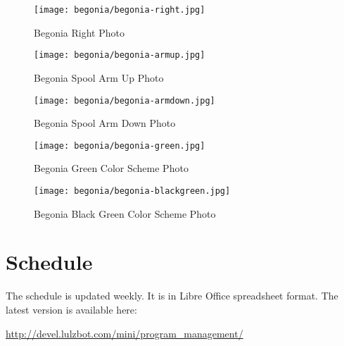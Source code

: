\begin{figure}[H]
\centering
\texttt{[image: begonia/begonia-right.jpg]}
\caption{Begonia Right Photo}
\label{fig:begrightfoto}
\end{figure}

\begin{figure}[H]
\centering
\texttt{[image: begonia/begonia-armup.jpg]}
\caption{Begonia Spool Arm Up Photo}
\label{fig:begarmup}
\end{figure}

\begin{figure}[H]
\centering
\texttt{[image: begonia/begonia-armdown.jpg]}
\caption{Begonia Spool Arm Down Photo}
\label{fig:begarmdown}
\end{figure}

\begin{figure}[H]
\centering
\texttt{[image: begonia/begonia-green.jpg]}
\caption{Begonia Green Color Scheme Photo}
\label{fig:beggreen}
\end{figure}

\begin{figure}[H]
\centering
\texttt{[image: begonia/begonia-blackgreen.jpg]}
\caption{Begonia Black Green Color Scheme Photo}
\label{fig:begblackgreen}
\end{figure}


\section{Schedule}
The schedule is updated weekly. It is in Libre Office spreadsheet format. The
latest version is available here:

\url{http://devel.lulzbot.com/mini/program_management/}






